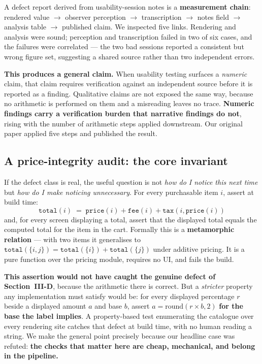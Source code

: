 \documentclass[conference]{IEEEtran}
\begin{document}
A defect report derived from usability-session notes is a \textbf{measurement chain}: rendered value
$\rightarrow$ observer perception $\rightarrow$ transcription $\rightarrow$ notes field $\rightarrow$
analysis table $\rightarrow$ published claim. We inspected five links. Rendering and analysis were
sound; perception and transcription failed in two of six cases, and the failures were correlated --- the
two bad sessions reported a consistent but wrong figure set, suggesting a shared source rather than two
independent errors.

\textbf{This produces a general claim.} When usability testing surfaces a \emph{numeric} claim, that
claim requires verification against an independent source before it is reported as a finding. Qualitative
claims are not exposed the same way, because no arithmetic is performed on them and a misreading leaves
no trace. \textbf{Numeric findings carry a verification burden that narrative findings do not}, rising
with the number of arithmetic steps applied downstream. Our original paper applied five steps and
published the result.

\subsection{A price-integrity audit: the core invariant}

If the defect class is real, the useful question is not \emph{how do I notice this next time} but \emph{how
do I make noticing unnecessary}. For every purchasable item $i$, assert at build time:
\[
  \texttt{total}(i) \;=\; \texttt{price}(i) + \texttt{fee}(i) + \texttt{tax}(i, \texttt{price}(i))
\]
and, for every screen displaying a total, assert that the displayed total equals the computed total for
the item in the cart. Formally this is a \textbf{metamorphic relation} --- with two items it generalises
to $\texttt{total}(\{i,j\}) = \texttt{total}(\{i\}) + \texttt{total}(\{j\})$ under additive pricing. It
is a pure function over the pricing module, requires no UI, and fails the build.

\textbf{This assertion would not have caught the genuine defect of Section~III-D}, because the arithmetic
there is correct. But a \emph{stricter} property any implementation must satisfy would be: for every
displayed percentage $r$ beside a displayed amount $a$ and base $b$, assert
$a = \mathrm{round}(r \times b, 2)$ \textbf{for the base the label implies}. A property-based test
enumerating the catalogue over every rendering site catches that defect at build time, with no human
reading a string. We make the general point precisely because our headline case was refuted:
\textbf{the checks that matter here are cheap, mechanical, and belong in the pipeline.}
\end{document}
